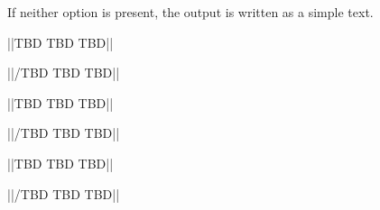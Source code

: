 If neither option is present, the output is written as a simple text.


\secondaryEnd{}


			||TBD TBD TBD||

			||/TBD TBD TBD||


			||TBD TBD TBD||

			||/TBD TBD TBD||



			||TBD TBD TBD||

			||/TBD TBD TBD||


\secondaryEnd{}

\primaryEnd{}

